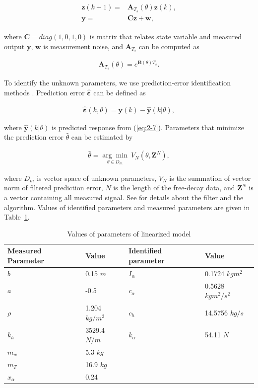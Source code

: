 \documentclass[openacc]{rsproca_new}%
\def\epsilon{\varepsilon}
\def\vec#1{\ensuremath{\mathbf{#1}}}
\newcommand{\Eref}[1]{(\ref{#1})}
\newcommand{\Tref}[1]{Table~\ref{#1}}
\begin{document}
\begin{align}\label{eq:2-7}
  \begin{split}
\vec{z}(k+1)=&\vec{A}_{T_s}(\theta)\vec{z}(k),\\
\vec{y}=&\vec{C}\vec{z}+\vec{w},
\end{split}
\end{align}

\noindent where $\vec{C}=diag(1,0,1,0)$ is matrix that relates state variable and measured output $\vec{y}$, $\vec{w}$ is measurement noise, and $\vec{A}_{T_s}$ can be computed as

\begin{align}\label{eq:2-8}
\vec{A}_{T_s}(\theta)=e^{\vec{B}(\theta)T_s}.
\end{align}


\noindent To identify the unknown parameters, we use prediction-error identification methods \cite{ljung2001system}. Prediction error \vec{\hat \epsilon} can be defined as

\begin{align}\label{eq:2-9}
\vec{\hat \epsilon}(k,\theta)=\vec{y}(k)-\hat{\vec{y}}(k|\theta),
\end{align}

\noindent where $\hat{\vec{y}}(k|\theta)$ is predicted response from \Eref{eq:2-7}. Parameters that minimize the prediction error $\hat \theta$ can be estimated by

\begin{align}\label{eq:2-10}
\hat{\theta}=\underset{\theta \in D_m}{\arg\min} \: V_N(\theta,\vec{Z}^N),
\end{align}

\noindent where $D_m$ is vector space of unknown parameters, $V_N$ is the summation of vector norm of filtered prediction error, $N$ is the length of the free-decay data, and $\vec{Z}^N$ is a vector containing all measured signal. See \cite{ljung2001system} for details about the filter and the algorithm. Values of identified parameters and measured parameters are given in \Tref{t2}.

\begin{table}[!ht]
\caption{Values of parameters of linearized model}%
\label{t2}
\begin{tabular}{llll}%
\hline
Measured Parameter & Value & Identified parameter & Value \\
\hline
$b$ & 0.15  $m$ & $I_{\alpha}$ & 0.1724  $kgm^2$ \\
$a$ & -0.5 & $c_\alpha$ & 0.5628  $kgm^2/s^2$ \\
$\rho$ & 1.204  $kg/m^3$ & $c_h$  & 14.5756  $kg/s$ \\
$k_{h}$ & 3529.4  $N/m$ & $k_\alpha$ & 54.11  $N$ \\
$m_w$ & 5.3  $kg$ & & \\
$m_T$ &  16.9  $kg$ & &  \\
$x_\alpha$ & 0.24 & & \\
\hline
\end{tabular}
\vspace*{-4pt}
\end{table}%
\end{document}
